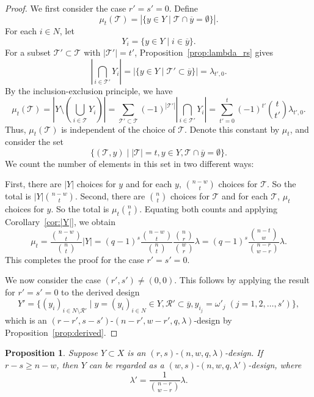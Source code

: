 \documentclass[a4paper, 11pt]{article}
\newtheorem{proposition}[theorem]{Proposition}
\theoremstyle{definition}
\begin{document}
\begin{proof}
We first consider the case $r' = s' = 0$.
Define
\[
\mu_t(\mathcal{T}) = |\{y \in Y \mid \mathcal{T} \cap \overline{y} = \emptyset\}|.
\]
For each $i \in N$, let
\[
Y_i = \{ y \in Y \mid i \in \overline{y}\}.
\]
For a subset $\mathcal{T}' \subset \mathcal{T}$ with $|\mathcal{T}'| = t'$,
Proposition~\ref{prop:lambda_rs} gives
\[
\left| \bigcap_{i \in \mathcal{T}'} Y_i \right| = |\{ y \in Y \mid \mathcal{T}' \subset \overline{y}\}| = \lambda_{t', 0}.
\]
By the inclusion-exclusion principle, we have
\[
\mu_t(\mathcal{T})
= \left| Y \setminus \left( \bigcup_{i \in \mathcal{T}} Y_i \right)\right| 
= \sum_{\mathcal{T}' \subset \mathcal{T}} (-1)^{|\mathcal{T}'|} \left| \bigcap_{i \in \mathcal{T}'} Y_i \right| 
= \sum_{t' = 0}^t (-1)^{t'} \binom{t}{t'} \lambda_{t',0}.
\]
Thus, $\mu_t(\mathcal{T})$ is independent of the choice of $\mathcal{T}$.
Denote this constant by $\mu_t$, and consider the set
\[
\{ (\mathcal{T}, y) \mid |\mathcal{T}| = t, y \in Y, \mathcal{T} \cap \overline{y} = \emptyset\}.
\]
We count the number of elements in this set in two different ways:

First, there are $|Y|$ choices for $y$ and for each $y$, $\binom{n-w}{t}$ choices for $\mathcal{T}$.
So the total is $|Y|\binom{n-w}{t}$.
Second, there are $\binom{n}{t}$ choices for $\mathcal{T}$ and for each $\mathcal{T}$, $\mu_t$ choices for $y$.
So the total is $\mu_t\binom{n}{t}$.
Equating both counts and applying Corollary~\ref{cor:|Y|}, we obtain 
\[
\mu_t = \frac{\binom{n-w}{t}}{\binom{n}{t}} |Y| = (q-1)^{s} \frac{\binom{n-w}{t}}{\binom{n}{t}} \frac{\binom{n}{r}}{\binom{w}{r}} \lambda
=
(q-1)^s \frac{\binom{n-t}{w}}{\binom{n-r}{w-r}} \lambda.
\]
This completes the proof for the case $r' = s' = 0$.

We now consider the case $(r',s') \neq (0,0)$.
This follows by applying the result for $r' = s' = 0$ to the derived design
\[
Y' = \{ (y_i)_{i \in N \setminus \mathcal{R}'} \mid y = (y_i)_{i \in N} \in Y, \mathcal{R}' \subset \overline{y}, y_{i_j} = \omega'_j \; (j = 1,2,\ldots,s')\},
\]
which is an $(r-r',s-s')$-$(n-r',w-r',q,\lambda)$-design by Proposition~\ref{prop:derived}.
\end{proof}
\begin{proposition}\label{prop:reduction}
Suppose $Y \subset X$ is an $(r,s)$-$(n, w, q, \lambda)$-design.
If $r-s \ge n-w$, then $Y$ can be regarded as a $(w,s)$-$(n,w,q,\lambda')$-design, where 
\[
\lambda' = \frac{1}{\binom{n-r}{w-r}} \lambda.
\]
\end{proposition}
\end{document}
